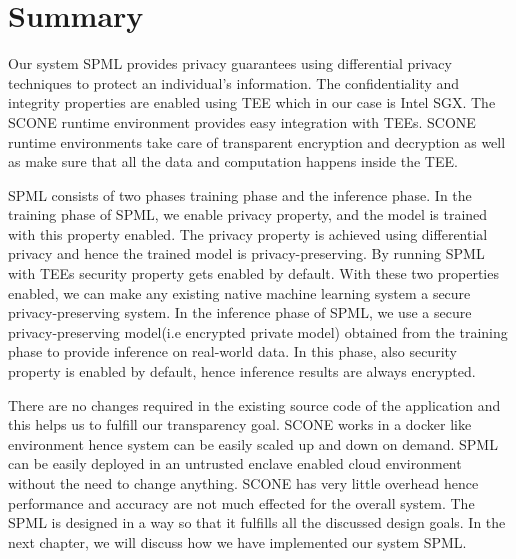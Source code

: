 \section{Summary}
Our system SPML provides privacy guarantees using differential privacy techniques to protect an individual's information. The confidentiality and integrity properties are enabled using TEE which in our case is Intel SGX. The SCONE runtime environment provides easy integration with TEEs. SCONE runtime environments take care of transparent encryption and decryption as well as make sure that all the data and computation happens inside the TEE. 

SPML consists of two phases training phase and the inference phase. In the training phase of SPML, we enable privacy property, and the model is trained with this property enabled. The privacy property is achieved using differential privacy and hence the trained model is privacy-preserving. By running SPML with TEEs security property gets enabled by default. With these two properties enabled, we can make any existing native machine learning system a secure privacy-preserving system. In the inference phase of SPML, we use a secure privacy-preserving model(i.e encrypted private model) obtained from the training phase to provide inference on real-world data. In this phase, also security property is enabled by default, hence inference results are always encrypted.

There are no changes required in the existing source code of the application and this helps us to fulfill our transparency goal. SCONE works in a docker like environment hence system can be easily scaled up and down on demand. SPML can be easily deployed in an untrusted enclave enabled cloud environment without the need to change anything. SCONE has very little overhead hence performance and accuracy are not much effected for the overall system. The SPML is designed in a way so that it fulfills all the discussed design goals. In the next chapter, we will discuss how we have implemented our system SPML.

